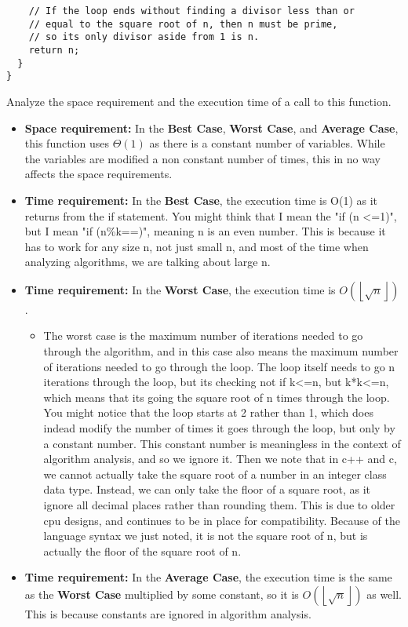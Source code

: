 \begin{enumerate}
\begin{lstlisting}
    // If the loop ends without finding a divisor less than or
    // equal to the square root of n, then n must be prime,
    // so its only divisor aside from 1 is n.
    return n;
  }
}
\end{lstlisting}
Analyze the space requirement and the execution time of a call to this function.
  \begin{itemize}
  \item \textbf{Space requirement:} In the \textbf{Best Case}, \textbf{Worst Case}, and \textbf{Average Case}, this function uses $\Theta(1)$ as there is a constant number of variables. While the variables are modified a non constant number of times, this in no way affects the space requirements.
  \item \textbf{Time requirement:} In the \textbf{Best Case}, the execution time is O(1) as it returns from the if statement. You might think that I mean the "if (n <=1)", but I mean "if (n\%k==)", meaning n is an even number. This is because it has to work for any size n, not just small n, and most of the time when analyzing algorithms, we are talking about large n.
  \item \textbf{Time requirement:} In the \textbf{Worst Case}, the execution time is $O\left(\left\lfloor\sqrt{n}\right\rfloor\right)$. 
    \begin{itemize}
    \item The worst case is the maximum number of iterations needed to go through the algorithm, and in this case also means the maximum number of iterations needed to go through the loop. The loop itself needs to go n iterations through the loop, but its checking not if k<=n, but k*k<=n, which means that its going the square root of n times through the loop. You might notice that the loop starts at 2 rather than 1, which does indead modify the number of times it goes through the loop, but only by a constant number. This constant number is meaningless in the context of algorithm analysis, and so we ignore it. Then we note that in c++ and c, we cannot actually take the square root of a number in an integer class data type. Instead, we can only take the floor of a square root, as it ignore all decimal places rather than rounding them. This is due to older cpu designs, and continues to be in place for compatibility. Because of the language syntax we just noted, it is not the square root of n, but is actually the floor of the square root of n.
    \end{itemize}
  \item \textbf{Time requirement:} In the \textbf{Average Case}, the execution time is the same as the \textbf{Worst Case} multiplied by some constant, so it is $O\left(\left\lfloor\sqrt{n}\right\rfloor\right)$ as well. This is because constants are ignored in algorithm analysis.
  \end{itemize}


\end{enumerate}
